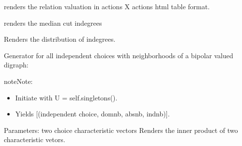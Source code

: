 \documentclass[letterpaper,10pt,english]{sphinxmanual}
\begin{document}
\begin{fulllineitems}
\begin{fulllineitems}
\label{techDoc:digraphs.Digraph.htmlRelationTable}
renders the relation valuation in actions X actions html table format.

\end{fulllineitems}


\begin{fulllineitems}
\label{techDoc:digraphs.Digraph.inDegrees}
renders the median cut indegrees

\end{fulllineitems}


\begin{fulllineitems}
\label{techDoc:digraphs.Digraph.inDegreesDistribution}
Renders the distribution of indegrees.

\end{fulllineitems}


\begin{fulllineitems}
\label{techDoc:digraphs.Digraph.independentChoices}
Generator for all independent choices with neighborhoods of a bipolar valued digraph:

\begin{notice}{note}{Note:}\begin{itemize}
\item {} 
Initiate with U = self.singletons().

\item {} 
Yields {[}(independent choice, domnb, absnb, indnb){]}.

\end{itemize}
\end{notice}

\end{fulllineitems}


\begin{fulllineitems}
\label{techDoc:digraphs.Digraph.inner_prod}
Parameters: two choice characteristic vectors
Renders the inner product of two characteristic vetors.


\end{fulllineitems}
\end{fulllineitems}
\end{document}
